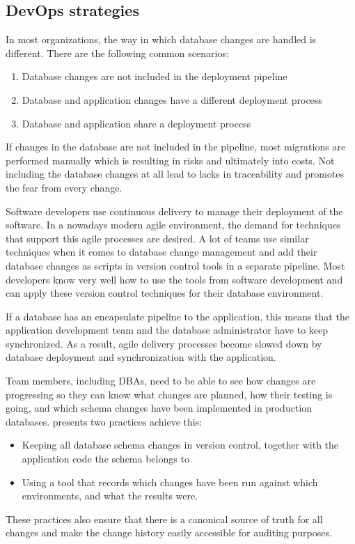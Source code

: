 \subsection{DevOps strategies}
%
In most organizations, the way in which database changes are handled is different. There are the following common scenarios:

\begin{enumerate}
	\item Database changes are not included in the deployment pipeline
	\item Database and application changes have a different deployment process 
	\item Database and application share a deployment process
\end{enumerate}


If changes in the database are not included in the pipeline, most migrations are performed manually which is resulting in risks and ultimately into costs. Not including the database changes at all lead to lacks in traceability and promotes the fear from every change.

Software developers use continuous delivery to manage their deployment of the software. In a nowadays modern agile environment, the demand for techniques that support this agile processes are desired. A lot of teams use similar techniques when it comes to database change management and add their database changes as scripts in version control tools in a separate pipeline. Most developers know very well how to use the tools from software development and can apply these version control techniques for their database environment.

If a database has an encapsulate pipeline to the application, this means that the application development team and the database administrator have to keep synchronized. As a result, agile delivery processes become slowed down by database deployment and synchronization with the application.

Team members, including DBAs, need to be able to see how changes are progressing so they can know what changes are planned, how their testing is going, and which schema changes have been implemented in production databases. \cite{GoogleDevOps2022} presents two practices achieve this:
\begin{itemize}
	\item Keeping all database schema changes in version control, together with the application code the schema belongs to
	\item Using a tool that records which changes have been run against which environments, and what the results were.
\end{itemize}
These practices also ensure that there is a canonical source of truth for all changes and make the change history easily accessible for auditing purposes.

